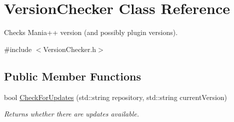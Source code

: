 \hypertarget{classVersionChecker}{\section{Version\-Checker Class Reference}
\label{classVersionChecker}
}


Checks Mania++ version (and possibly plugin versions).  




{\ttfamily \#include $<$Version\-Checker.\-h$>$}

\subsection*{Public Member Functions}
\begin{DoxyCompactItemize}
\item 
bool \hyperlink{classVersionChecker_afb48bf9325d6049baefbe2b8841d061e}{Check\-For\-Updates} (std\-::string repository, std\-::string current\-Version)
\begin{DoxyCompactList}\small\item\em Returns whether there are updates available. \end{DoxyCompactList}\end{DoxyCompactItemize}
